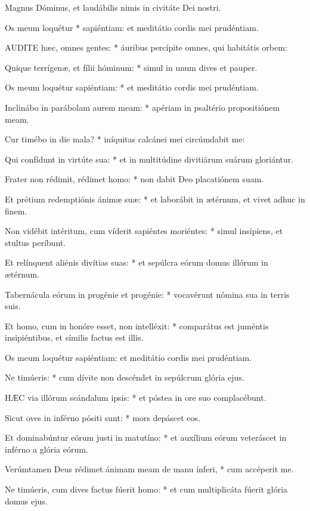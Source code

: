  Magnus Dóminus, et laudábilis nimis in civitáte Dei nostri.

 Os meum loquétur * sapiéntiam: et meditátio cordis mei prudéntiam.


\lettrine[lines=2]{A}{UDITE} hæc, omnes gentes: * áuribus percípite omnes, qui habitátis orbem:

Quique terrígenæ, et fílii hóminum: * simul in unum dives et pauper.

Os meum loquétur sapiéntiam: * et meditátio cordis mei prudéntiam.

Inclinábo in parábolam aurem meam: * apériam in psaltério propositiónem meam.

Cur timébo in die mala? * iníquitas calcánei mei circúmdabit me:

Qui confídunt in virtúte sua: * et in multitúdine divitiárum suárum gloriántur.

Frater non rédimit, rédimet homo: * non dabit Deo placatiónem suam.

Et prétium redemptiónis ánimæ suæ: * et laborábit in ætérnum, et vivet adhuc in finem.

Non vidébit intéritum, cum víderit sapiéntes moriéntes: * simul insípiens, et stultus períbunt.

Et relínquent aliénis divítias suas: * et sepúlcra eórum domus illórum in ætérnum.

Tabernácula eórum in progénie et progénie: * vocavérunt nómina sua in terris suis.

Et homo, cum in honóre esset, non intelléxit: * comparátus est juméntis insipiéntibus, et símilis factus est illis.

 Os meum loquétur sapiéntiam: et meditátio cordis mei prudéntiam.

 Ne timúeris: * cum dívite non descéndet in sepúlcrum glória ejus.


\lettrine[lines=2]{H}{ÆC} via illórum scándalum ipsis: * et póstea in ore suo complacébunt.

Sicut oves in inférno pósiti sunt: * mors depáscet eos.

Et dominabúntur eórum justi in matutíno: * et auxílium eórum veteráscet in inférno a glória eórum.

Verúmtamen Deus rédimet ánimam meam de manu ínferi, * cum accéperit me.

Ne timúeris, cum dives factus fúerit homo: * et cum multiplicáta fúerit glória domus ejus.

